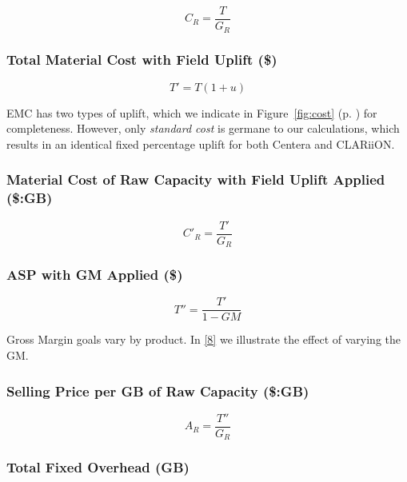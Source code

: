 \nopagebreak
\begin{equation}\label{eq:3}
C_R=\frac{T}{G_R}
\end{equation}
 

\subsubsection*{Total Material Cost with Field Uplift (\$)}


\nopagebreak
\begin{equation}\label{eq:4}
T'=T(1+u)
\end{equation}


EMC has two types of uplift, which we indicate in Figure~\ref{fig:cost} (p. \pageref{fig:cost}) for completeness. However, only \emph{standard cost} is germane to our calculations, which results in an identical fixed percentage uplift for both Centera and CLARiiON.

\subsubsection*{Material Cost of Raw Capacity with Field Uplift Applied (\$:GB)}


\nopagebreak
\begin{equation}\label{eq:5}
C'_R=\frac{T'}{G_R}
\end{equation}
 

\subsubsection*{ASP with GM Applied (\$)}


\nopagebreak
\begin{equation}\label{eq:6}
T''=\frac{T'}{1-GM}
\end{equation}


Gross Margin goals vary by product. In \hyperref[ref:8]{[8]} we illustrate the effect of varying the GM.

\subsubsection*{Selling Price per GB of Raw Capacity (\$:GB)}


\nopagebreak
\begin{equation}\label{eq:7}
A_R=\frac{T''}{G_R}
\end{equation}
 

\subsubsection*{Total Fixed Overhead (GB)}

